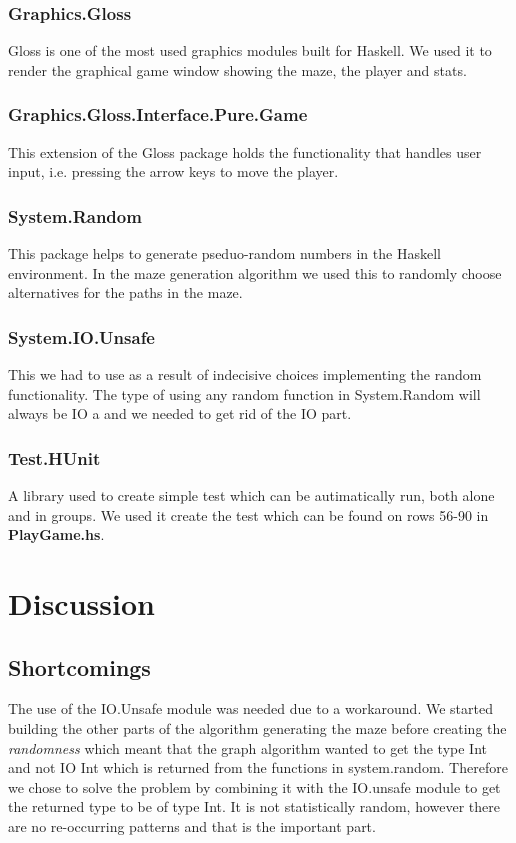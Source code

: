 \documentclass[12pt, a4paper]{article}
\begin{document}
\subsubsection*{Graphics.Gloss}
Gloss is one of the most used graphics modules built for Haskell. We used it to render the graphical game window showing the maze, the player and stats.\cite{Gloss}


\subsubsection*{Graphics.Gloss.Interface.Pure.Game}
This extension of the Gloss package holds the functionality that handles user input, i.e. pressing the arrow keys to move the player.


\subsubsection*{System.Random}
This package helps to generate pseduo-random numbers in the Haskell environment. In the maze generation algorithm we used this to randomly choose alternatives for the paths in the maze.\cite{System.Random}


\subsubsection*{System.IO.Unsafe}
This we had to use as a result of indecisive choices implementing the random functionality. The type of using any random function in System.Random will always be IO a and we needed to get rid of the IO part.\cite{IO.Unsafe}


\subsubsection*{Test.HUnit}
A library used to create simple test which can be autimatically run, both alone and in groups. We used it create the test which can be found on rows 56-90 in \textbf{PlayGame.hs}. \cite{HUnit}

\newpage
\section{Discussion}
\subsection{Shortcomings}
The use of the IO.Unsafe module was needed due to a workaround. We started building the other parts of the algorithm generating the maze before creating the \textit{randomness} which meant that the graph algorithm wanted to get the type Int and not IO Int which is returned from the functions in system.random. Therefore we chose to solve the problem by combining it with the IO.unsafe module to get the returned type to be of type Int. It is not statistically random, however there are no re-occurring patterns and that is the important part.
\end{document}

